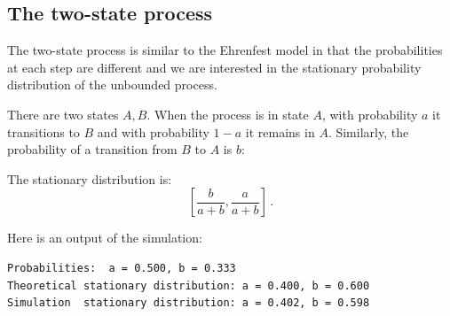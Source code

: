 \newpage

\subsection{The two-state process}

The two-state process is similar to the Ehrenfest model in that the probabilities at each step are different and we are interested in the stationary probability distribution of the unbounded process.

There are two states $A,B$. When the process is in state $A$, with probability $a$ it transitions to $B$ and with probability $1-a$ it remains in $A$. Similarly, the probability of a transition from $B$ to $A$ is $b$:
\begin{center}
\end{center}

The stationary distribution is:
\[
\left[\frac{b}{a+b}, \frac{a}{a+b}\right]\,.
\]

Here is an output of the simulation:
\begin{verbatim}
Probabilities:  a = 0.500, b = 0.333
Theoretical stationary distribution: a = 0.400, b = 0.600
Simulation  stationary distribution: a = 0.402, b = 0.598
\end{verbatim}
